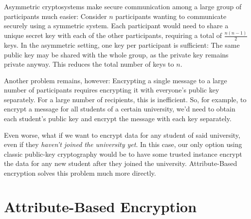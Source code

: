 Asymmetric cryptosystems make secure communication among a large group of participants much easier:
Consider $n$ participants wanting to communicate securely using a symmetric system.
Each participant would need to share a unique secret key with each of the other participants, requiring a total of $\frac{n(n-1)}{2}$ keys. In the asymmetric setting, one key per participant is sufficient: The same public key may be shared with the whole group, as the private key remains private anyway. This reduces the total number of keys to $n$.

Another problem remains, however: Encrypting a single message to a large number of participants requires encrypting it with everyone's public key separately.
For a large number of recipients, this is inefficient.
So, for example, to encrypt a message for all students of a certain university, we'd need to obtain each student's public key and encrypt the message with each key separately.

Even worse, what if we want to encrypt data for any student of said university, even if they \emph{haven't joined the university yet}.
In this case, our only option using classic public-key cryptography would be to have some trusted instance encrypt the data for any new student after they joined the university.
Attribute-Based encryption solves this problem much more directly.

\section{Attribute-Based Encryption}

